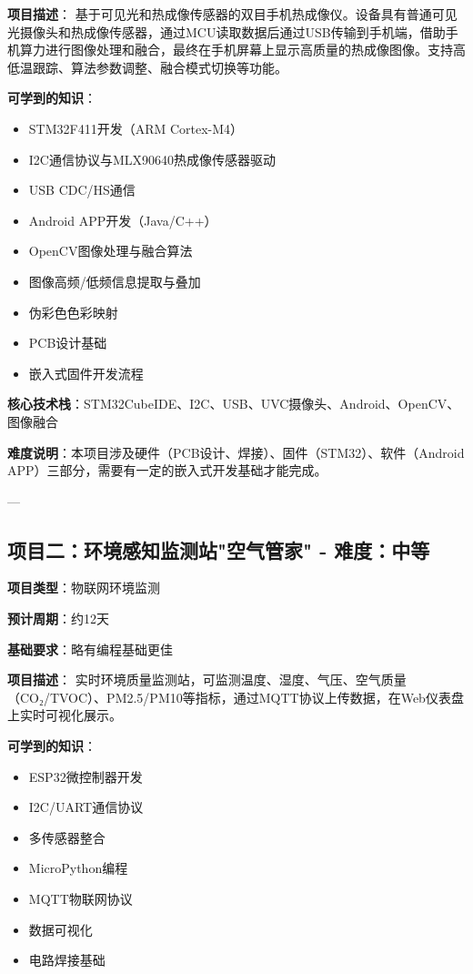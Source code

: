 \documentclass[12pt,a4paper]{article}
\begin{document}
\textbf{项目描述}：
基于可见光和热成像传感器的双目手机热成像仪。设备具有普通可见光摄像头和热成像传感器，通过MCU读取数据后通过USB传输到手机端，借助手机算力进行图像处理和融合，最终在手机屏幕上显示高质量的热成像图像。支持高低温跟踪、算法参数调整、融合模式切换等功能。

\textbf{可学到的知识}：
\begin{itemize}
    \item STM32F411开发（ARM Cortex-M4）
    \item I2C通信协议与MLX90640热成像传感器驱动
    \item USB CDC/HS通信
    \item Android APP开发（Java/C++）
    \item OpenCV图像处理与融合算法
    \item 图像高频/低频信息提取与叠加
    \item 伪彩色色彩映射
    \item PCB设计基础
    \item 嵌入式固件开发流程
\end{itemize}

\textbf{核心技术栈}：STM32CubeIDE、I2C、USB、UVC摄像头、Android、OpenCV、图像融合

\textbf{难度说明}：本项目涉及硬件（PCB设计、焊接）、固件（STM32）、软件（Android APP）三部分，需要有一定的嵌入式开发基础才能完成。

---

\subsection{项目二：环境感知监测站"空气管家" - 难度：中等}

\textbf{项目类型}：物联网环境监测

\textbf{预计周期}：约12天

\textbf{基础要求}：略有编程基础更佳

\textbf{项目描述}：
实时环境质量监测站，可监测温度、湿度、气压、空气质量（CO₂/TVOC）、PM2.5/PM10等指标，通过MQTT协议上传数据，在Web仪表盘上实时可视化展示。

\textbf{可学到的知识}：
\begin{itemize}
    \item ESP32微控制器开发
    \item I2C/UART通信协议
    \item 多传感器整合
    \item MicroPython编程
    \item MQTT物联网协议
    \item 数据可视化
    \item 电路焊接基础
\end{itemize}
\end{document}
